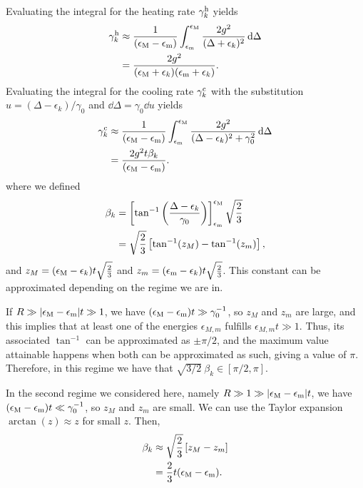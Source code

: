 Evaluating the integral for the heating rate $\gamma_k^{\rm h}$ yields
\begin{align}
    \gamma_k^{\rm h} &\approx \frac{1}{(\epsilon_{\rm M}-\epsilon_{\rm m})} \int_{\epsilon_{\rm m}}^{\epsilon_{\rm M}} \frac{2g^2}{(\Delta+\epsilon_k)^2} \mathop{}\!\mathrm{d}\Delta\nonumber\\
                     &= \frac{2g^2}{(\epsilon_{\rm M}+\epsilon_k)(\epsilon_{\rm m}+\epsilon_k)}.
\end{align}
Evaluating the integral for the cooling rate $\gamma_k^{\rm c}$ with the substitution $u = (\Delta - \epsilon_k) / \gamma_0$ and $\dd\Delta = \gamma_0 \dd u$ yields
\begin{align}
    \gamma_k^{\rm c} &\approx \frac{1}{(\epsilon_{\rm M}-\epsilon_{\rm m})} \int_{\epsilon_{\rm m}}^{\epsilon_{\rm M}} \frac{2g^2}{(\Delta-\epsilon_k)^2+ \gamma_0^2} \mathop{}\!\mathrm{d}\Delta\nonumber\\
                     &= \frac{2g^2 t \beta_k}{(\epsilon_{\rm M}-\epsilon_{\rm m})}.
\end{align}
where we defined
\begin{align}
    \beta_k &=\left[\tan^{-1}\left(\frac{\Delta-\epsilon_k}{\gamma_0}\right)\right]_{\epsilon_{\rm m}}^{\epsilon_{\rm M}}\sqrt{\frac{2}{3}}\nonumber\\
            &= \sqrt{\frac{2}{3}} \left[ \tan^{-1}(z_M) - \tan^{-1}(z_m) \right],
\end{align}
and $z_M = (\epsilon_{\rm M}-\epsilon_k)t \sqrt{\frac{2}{3}}$ and $z_m = (\epsilon_{\rm m}-\epsilon_k)t \sqrt{\frac{2}{3}}$.
This constant can be approximated depending on the regime we are in.

If $R\gg|\epsilon_{\rm M}-\epsilon_{\rm m}|t\gg1$, we have $(\epsilon_{\rm M}-\epsilon_{\rm m})t \gg \gamma_0^{-1}$, so $z_M$ and $z_m$ are large, and this implies that at least one of the energies $\epsilon_{M,m}$ fulfills $\epsilon_{M,m}t\gg1$. Thus, its associated $\tan^{-1}$ can be approximated as $\pm\pi/2$, and the maximum value attainable happens when both can be approximated as such, giving a value of $\pi$. Therefore, in this regime we have that $\sqrt{3/2}\ \beta_k\in[\pi/2,\pi]$.

In the second regime we considered here, namely $R\gg1\gg|\epsilon_{\rm M}-\epsilon_{\rm m}|t$, we have $(\epsilon_{\rm M}-\epsilon_{\rm m})t \ll \gamma_0^{-1}$, so $z_M$ and $z_m$ are small.
We can use the Taylor expansion $\arctan(z) \approx z$ for small $z$. Then,
\begin{align}
    \beta_k &\approx \sqrt{\frac{2}{3}} \left[ z_M - z_m \right]\nonumber\\
            &= \frac{2}{3} t (\epsilon_{\rm M}-\epsilon_{\rm m}).
\end{align}

